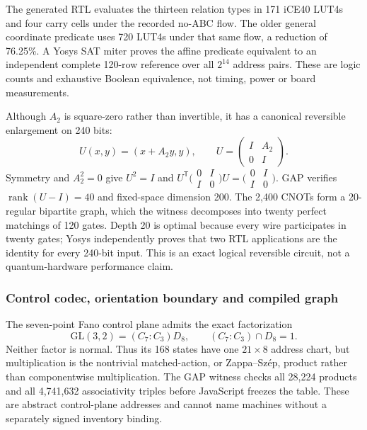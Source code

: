 \documentclass[11pt,letterpaper]{article}
\newcommand{\tagbox}[3]{\tikz[baseline=(X.base)]{\node[inner xsep=3.5pt,inner ysep=1.4pt,rounded corners=1.6pt,fill=#1,text=#2,font=\bfseries\sffamily\tiny] (X) {#3};}}
\newcommand{\PROVED}{\tagbox{greenlite}{green!45!black}{PROVED}}
\begin{document}
The generated RTL evaluates the thirteen relation types in 171 iCE40 LUT4s
and four carry cells under the recorded no-ABC flow. The older general
coordinate predicate uses 720 LUT4s under that same flow, a reduction of
76.25\%. A Yosys SAT miter proves the affine predicate equivalent to an
independent complete 120-row reference over all $2^{14}$ address pairs. These
are logic counts and exhaustive Boolean equivalence, not timing, power or
board measurements. \PROVED

Although $A_2$ is square-zero rather than invertible, it has a canonical
reversible enlargement on 240 bits:
\[
 U(x,y)=(x+A_2y,y),\qquad
 U=\begin{pmatrix}I&A_2\\0&I\end{pmatrix}.
\]
Symmetry and $A_2^2=0$ give $U^2=I$ and
$U^{\mathsf T}\bigl(\begin{smallmatrix}0&I\\I&0\end{smallmatrix}\bigr)U
=\bigl(\begin{smallmatrix}0&I\\I&0\end{smallmatrix}\bigr)$.
GAP verifies $\operatorname{rank}(U-I)=40$ and fixed-space dimension 200.
The 2,400 CNOTs form a 20-regular bipartite graph, which the witness decomposes
into twenty perfect matchings of 120 gates. Depth 20 is optimal because every
wire participates in twenty gates; Yosys independently proves that two RTL
applications are the identity for every 240-bit input. This is an exact
logical reversible circuit, not a quantum-hardware performance claim.
\PROVED

\subsubsection{Control codec, orientation boundary and compiled graph}

The seven-point Fano control plane admits the exact factorization
\[
 \mathrm{GL}(3,2)=(C_7{:}C_3)D_8,
 \qquad (C_7{:}C_3)\cap D_8=1.
\]
Neither factor is normal. Thus its 168 states have one $21\times8$ address
chart, but multiplication is the nontrivial matched-action, or Zappa--Sz\'ep,
product rather than componentwise multiplication. The GAP witness checks all
28,224 products and all 4,741,632 associativity triples before JavaScript
freezes the table. These are abstract control-plane addresses and cannot name
machines without a separately signed inventory binding. \PROVED
\end{document}
